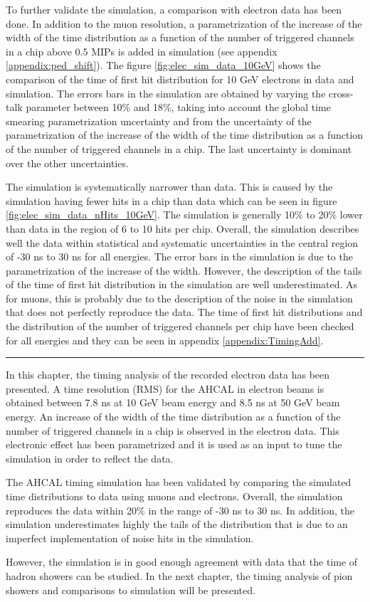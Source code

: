 To further validate the simulation, a comparison with electron data has been done. In addition to the muon resolution, a parametrization of the increase of the width of the time distribution as a function of the number of triggered channels in a chip above 0.5 MIPs is added in simulation (see appendix \ref{appendix:ped_shift}). The figure \ref{fig:elec_sim_data_10GeV} shows the comparison of the time of first hit distribution for 10 GeV electrons in data and simulation. The errors bars in the simulation are obtained by varying the cross-talk parameter between 10\% and 18\%, taking into account the global time smearing parametrization uncertainty and from the uncertainty of the parametrization of the increase of the width of the time distribution as a function of the number of triggered channels in a chip. The last uncertainty is dominant over the other uncertainties.

The simulation is systematically narrower than data. This is caused by the simulation having fewer hits in a chip than data which can be seen in figure \ref{fig:elec_sim_data_nHits_10GeV}. The simulation is generally 10\% to 20\% lower than data in the region of 6 to 10 hits per chip. Overall, the simulation describes well the data within statistical and systematic uncertainties in the central region of -30 ns to 30 ns for all energies. The error bars in the simulation is due to the parametrization of the increase of the width. However, the description of the tails of the time of first hit distribution in the simulation are well underestimated. As for muons, this is probably due to the description of the noise in the simulation that does not perfectly reproduce the data. The time of first hit distributions and the distribution of the number of triggered channels per chip have been checked for all energies and they can be seen in appendix \ref{appendix:TimingAdd}.

\begin{center}
	\rule{0.5\textwidth}{.4pt}
\end{center}

In this chapter, the timing analysis of the recorded electron data has been presented. A time resolution (RMS) for the AHCAL in electron beams is obtained between 7.8 ns at 10 GeV beam energy and 8.5 ns at 50 GeV beam energy. An increase of the width of the time distribution as a function of the number of triggered channels in a chip is observed in the electron data. This electronic effect has been parametrized and it is used as an input to tune the simulation in order to reflect the data.

The AHCAL timing simulation has been validated by comparing the simulated time distributions to data using muons and electrons. Overall, the simulation reproduces the data within 20\% in the range of -30 ns to 30 ns. In addition, the simulation underestimates highly the tails of the distribution that is due to an imperfect implementation of noise hits in the simulation.

However, the simulation is in good enough agreement with data that the time of hadron showers can be studied. In the next chapter, the timing analysis of pion showers and comparisons to simulation will be presented.
